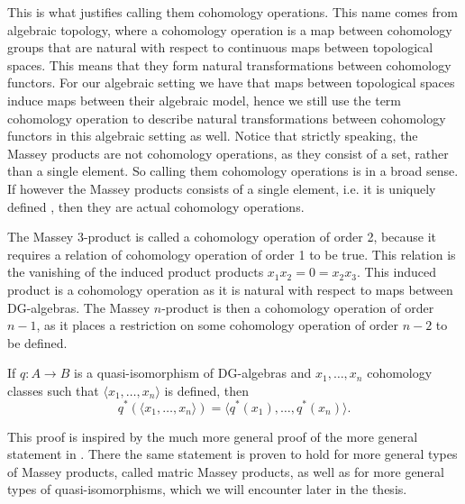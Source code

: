 This is what justifies calling them cohomology operations. This name comes  from algebraic topology, where a cohomology operation is a map between cohomology groups that are natural with respect to continuous maps between topological spaces. This means that they form natural transformations between cohomology functors. For our algebraic setting we have that maps between topological spaces induce maps between their algebraic model, hence we still use the term cohomology operation to describe natural transformations between cohomology functors in this algebraic setting as well. Notice that strictly speaking, the Massey products are not cohomology operations, as they consist of a set, rather than a single element. So calling them cohomology operations is in a broad sense. If however the Massey products consists of a single element, i.e. it is uniquely defined	, then they are actual cohomology operations. 

The Massey 3-product is called a cohomology operation of order 2, because it requires a relation of cohomology operation of order 1 to be true. This relation is the vanishing of the induced product products $x_1 x_2 = 0 = x_2 x_3$. This induced product is a cohomology operation as it is natural with respect to maps between DG-algebras. The Massey $n$-product is then a cohomology operation of order $n-1$, as it places a restriction on some cohomology operation of order $n-2$ to be defined.   


\begin{theorem}
If $q\colon A\longrightarrow B$ is a quasi-isomorphism of DG-algebras and $x_1, \ldots, x_n$ cohomology classes such that $\langle x_1, \ldots, x_n\rangle$ is defined, then 
\begin{equation*}
    q^*(\langle x_1, \ldots, x_n\rangle) = \langle q^*(x_1),\ldots, q^*(x_n)\rangle .
\end{equation*}
\end{theorem}

This proof is inspired by the much more general proof of the more general statement in \cite[Theorem 1.5]{naturality}. There the same statement is proven to hold for more general types of Massey products, called matric Massey products, as well as for more general types of quasi-isomorphisms, which we will encounter later in the thesis. 

